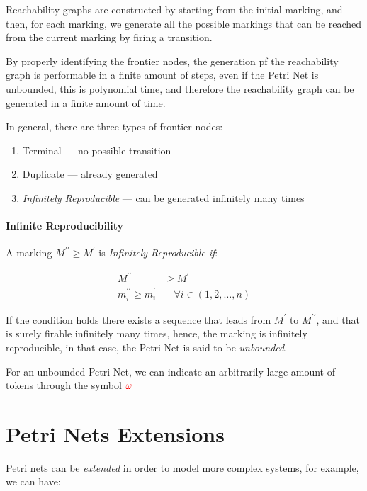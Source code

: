 \documentclass[openright, twoside, twocolumn, a4paper, 10pt]{report}
\begin{document}
Reachability graphs are constructed by starting from the initial marking, and then, for each marking, we
generate all the possible markings that can be reached from the current marking by firing a transition.

By properly identifying the frontier nodes, the generation pf the reachability graph
is performable in a finite amount of steps, even if the Petri Net is unbounded, this is
polynomial time, and therefore the reachability graph can be generated in a finite amount of time.

In general, there are three types of frontier nodes:

\begin{enumerate}
	\item Terminal --- no possible transition
	\item Duplicate --- already generated
	\item \emph{Infinitely Reproducible} --- can be generated infinitely many times
\end{enumerate}

\paragraph{Infinite Reproducibility}

A marking $M^{\prime\prime} \geq  M^\prime$ is \emph{Infinitely Reproducible if}:

\begin{align}
	M^{\prime\prime}                     & \geq  M^\prime                           \\
	m_i^{\prime\prime}  \geq  m_i^\prime & \quad  \forall  i \in  (1, 2, \ldots, n)
\end{align}

If the condition holds there exists a sequence that leads from $M^\prime$ to $M^{\prime\prime}$, and that is surely firable infinitely many times, hence, the marking is infinitely reproducible, in that case, the Petri Net is said to be \emph{unbounded}.

For an unbounded Petri Net, we can indicate an arbitrarily large amount of tokens through
the symbol $\textcolor{red}{\omega} $

\section{Petri Nets Extensions}

Petri nets can be \emph{extended} in order to model more complex systems, for example, we can have:
\end{document}
